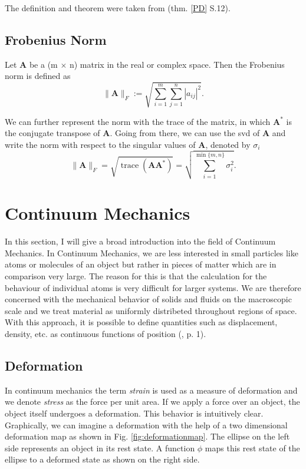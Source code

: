 The definition and theorem were taken from \cite{Spencer1980} (thm. \ref{PD} S.12).

\subsection{Frobenius Norm}

\begin{definition}
\label{FN}
Let \textbf{A} be a (m $\times$ n) matrix in the real or complex space. Then the Frobenius norm is defined as 
\[
\| \mathbf{A} \|_{F} := \sqrt{\sum\limits_{i=1}^{m} \sum\limits_{j=1}^{n} |a_{ij}|^2}.
\]
\end{definition}

We can further represent the norm with the trace of the matrix, in which $\mathbf{A}^*$ is the conjugate transpose of \textbf{A}. Going from there, we can use the \acrshort{svd} of \textbf{A} and write the norm with respect to the singular values of \textbf{A}, denoted by $\sigma_i$
\begin{equation} \label{eq:FN}
\| \mathbf{A} \|_{F} = \sqrt{\operatorname{trace}(\mathbf{A} \mathbf{A}^*)} = \sqrt{\sum\limits_{i=1}^{\operatorname{min}\{m,n\}} \sigma_i^2}.
\end{equation}




\section{Continuum Mechanics}
In this section, I will give a broad introduction into the field of Continuum Mechanics. In Continuum Mechanics, we are less interested in small particles like atoms or molecules of an object but rather in pieces of matter which are in comparison very large. The reason for this is that the calculation for the behaviour of individual atoms is very difficult for larger systems. We are therefore concerned with the mechanical behavior of solids and fluids on the macroscopic scale and we treat material as uniformly distribeted throughout regions of space. With this approach, it is possible to define quantities such as displacement, density, etc. as continuous functions of position (\cite{Spencer1980}, p. 1).


\subsection{Deformation}
In continuum mechanics the term \textit{strain} is used as a measure of deformation and we denote \textit{stress} as the force per unit area. If we apply a force over an object, the object itself undergoes a deformation. This behavior is intuitively clear. Graphically, we can imagine a deformation with the help of a two dimensional deformation map as shown in Fig. \ref{fig:deformationmap}. The ellipse on the left side represents an object in its rest state. A function $\phi$ maps this rest state of the ellipse to a deformed state as shown on the right side.

